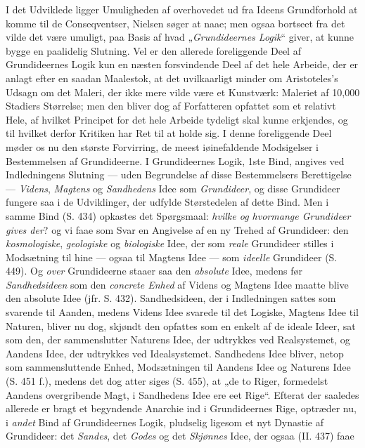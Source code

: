 \documentclass[12pt,a4paper]{book}
\newcommand{\opage}[1]{\marginnote{\footnotesize\textit{[#1]}}}
\begin{document}
I det Udviklede ligger Umuligheden af overhovedet ud fra Ideens Grundforhold at komme til
de Conseqventser, Nielsen søger at naae; men ogsaa bortseet fra det vilde det være
umuligt, paa Basis af hvad „\emph{Grundideernes Logik}“ giver, at kunne bygge en paalidelig
Slutning. Vel er den allerede foreliggende Deel af Grundideernes Logik kun en næsten
forsvindende Deel af det hele Arbeide, der er anlagt efter en saadan Maalestok, at det
uvilkaarligt minder om Aristoteles's Udsagn om det Maleri, der ikke mere vilde være et
Kunstværk: Maleriet af 10,000 Stadiers Størrelse; men den bliver dog af Forfatteren
opfattet som et relativt Hele, af hvilket Principet for det hele Arbeide tydeligt skal
kunne erkjendes, og til hvilket derfor Kritiken har Ret til at holde sig. I denne
foreliggende Deel møder os nu den største Forvirring, de meest iøinefaldende Modsigelser i
Bestemmelsen af Grundideerne. I Grundideernes Logik, 1ste Bind, angives ved Indledningens
Slutning --- uden Begrundelse af disse Bestemmelsers Berettigelse --- \emph{Videns}, \emph{Magtens} og \emph{Sandhedens} Idee som \emph{Grundideer}, og disse Grundideer fungere saa i de Udviklinger, der
udfylde Størstedelen af dette Bind. Men i samme Bind (S. 434) opkastes det Spørgsmaal:
\emph{hvilke og hvormange Grundideer gives der}? og vi faae som Svar en Angivelse af en ny
Trehed af Grundideer: \opage{155}den \emph{kosmologiske}, \emph{geologiske} og \emph{biologiske} Idee, der som
\emph{reale} Grundideer stilles i Modsætning til hine --- ogsaa til Magtens Idee ---
som \emph{ideelle} Grundideer (S. 449). Og \emph{over} Grundideerne staaer saa den \emph{absolute} Idee, medens før \emph{Sandhedsideen} som den \emph{concrete Enhed} af Videns og Magtens Idee
maatte blive den absolute Idee (jfr. S. 432). Sandhedsideen, der i Indledningen sattes som
svarende til Aanden, medens Videns Idee svarede til det Logiske, Magtens Idee til Naturen,
bliver nu dog, skjøndt den opfattes som en enkelt af de ideale Ideer, sat som den, der
sammenslutter Naturens Idee, der udtrykkes ved Realsystemet, og Aandens Idee, der udtrykkes
ved Idealsystemet. Sandhedens Idee bliver, netop som sammensluttende Enhed, Modsætningen
til Aandens Idee og Naturens Idee (S. 451 f.), medens det dog atter siges (S. 455), at „de
to Riger, formedelst Aandens overgribende Magt, i Sandhedens Idee ere eet Rige“. Efterat
der saaledes allerede er bragt et begyndende Anarchie ind i Grundideernes Rige, optræder
nu, i \emph{andet} Bind af Grundideernes Logik, pludselig ligesom et nyt Dynastie af Grundideer:
det \emph{Sandes}, det \emph{Godes} og det \emph{Skjønnes} Idee, der ogsaa (II. 437) faae
\end{document}
